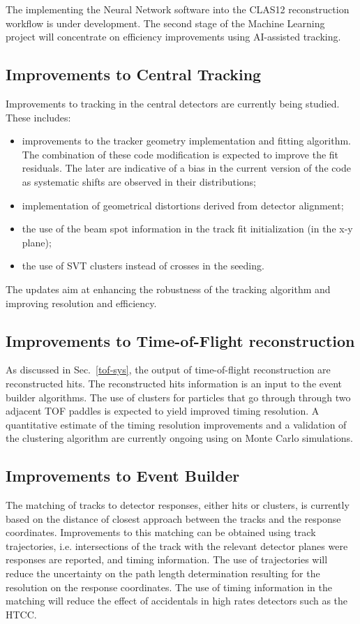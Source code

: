 The implementing the Neural Network software into the CLAS12 reconstruction workflow is under development. The second stage of the Machine Learning project will concentrate on efficiency improvements using AI-assisted tracking.

\subsection{Improvements to Central Tracking}
Improvements to tracking in the central detectors are currently being studied. These includes:
\begin{itemize}
    \item improvements to the tracker geometry implementation and fitting algorithm. The combination of these code modification is expected to improve the fit residuals. The later are indicative of a bias in the  current version of the code  as  systematic shifts are observed in their distributions;
    \item implementation of geometrical distortions derived from detector alignment;
    \item the use of the beam spot information  in the track fit initialization (in the x-y plane);
    \item the use of SVT clusters instead of crosses in the seeding.
\end{itemize}
The updates aim at enhancing the robustness of the tracking algorithm and improving resolution and efficiency.

\subsection{Improvements to Time-of-Flight reconstruction}
As discussed in Sec.~\ref{tof-sys}, the output of time-of-flight reconstruction are reconstructed hits.  The reconstructed hits information is an input to the event builder algorithms.  The use of clusters for particles that go through through two adjacent TOF paddles is expected to yield  improved timing resolution. A quantitative estimate of the timing resolution improvements and a validation of the clustering algorithm are currently ongoing using on Monte Carlo simulations.

\subsection{Improvements to Event Builder}
The matching of tracks to detector responses, either hits or clusters, is currently based on the distance of closest approach between the tracks and the response coordinates. Improvements to this matching can be obtained using track trajectories, i.e. intersections of the track with the relevant detector planes were responses are reported, and timing information. The use of trajectories will reduce the uncertainty on the path length determination resulting for the resolution on the response coordinates. The use of timing information in the matching will reduce the effect of accidentals in high rates detectors such as the HTCC.


